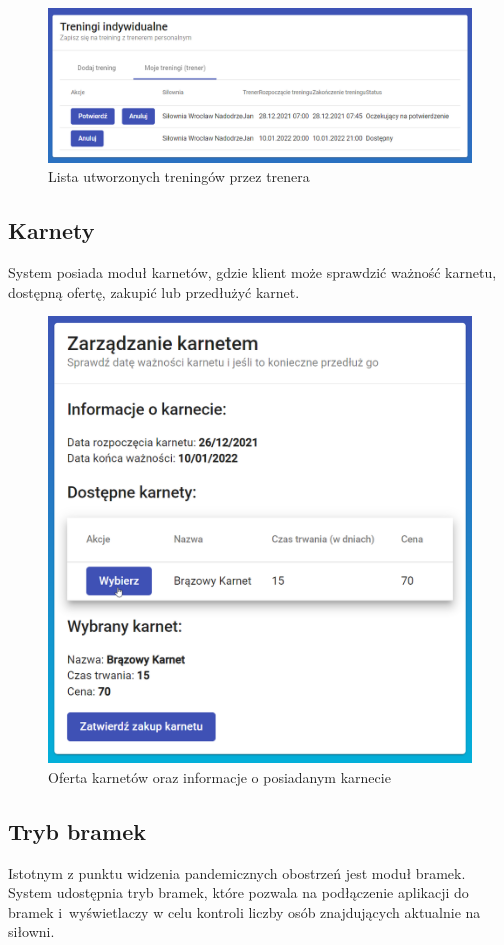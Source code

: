 \documentclass[a4paper,twoside,12pt]{book}
\begin{document}
\begin{figure}[h!]
	\centering
	\includegraphics[width=0.9\linewidth]{../zrzuty_ekranu/dzialanie/treningi/trener_lista_treningow}
	\caption{Lista utworzonych treningów przez trenera}
	\label{fig:trenerlistatreningow}
\end{figure}
\FloatBarrier

\subsection{Karnety}
System posiada moduł karnetów, gdzie klient może sprawdzić ważność karnetu, dostępną ofertę, zakupić lub przedłużyć karnet.
\begin{figure}[h!]
	\centering
	\includegraphics[width=0.5\linewidth]{../zrzuty_ekranu/dzialanie/karnety/lista_karnetow}
	\caption{Oferta karnetów oraz informacje o posiadanym karnecie}
	\label{fig:listakarnetow}
\end{figure}
\FloatBarrier

\subsection{Tryb bramek}
Istotnym z punktu widzenia pandemicznych obostrzeń jest moduł bramek. System udostępnia tryb bramek, które pozwala na podłączenie aplikacji do bramek i~wyświetlaczy w celu kontroli liczby osób znajdujących aktualnie na siłowni.
\end{document}
